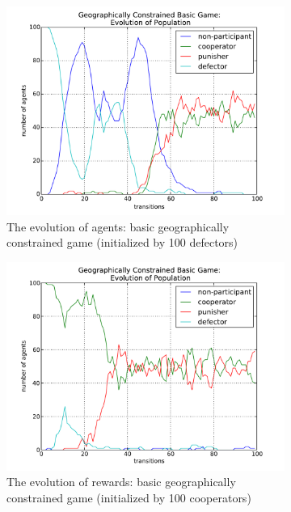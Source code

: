 \documentclass[11pt]{article}
\begin{document}
\begin{figure}[!h]
 \caption{Comparison of the initialization}
 \begin{subfigure}{.5\textwidth}
   \centering
   \caption{The evolution of agents: basic geographically constrained game (initialized by 100 defectors)}
   \includegraphics[scale = 0.4]{4.pdf}
 \end{subfigure}
  \begin{subfigure}{.5\textwidth}
   \label{}
   \centering
   \caption{The evolution of rewards: basic geographically constrained game (initialized by 100 cooperators)}
   \includegraphics[scale = 0.4]{12.pdf}
 \end{subfigure}
 \begin{subfigure}{.5\textwidth}

\end{subfigure}
\end{figure}
\end{document}
